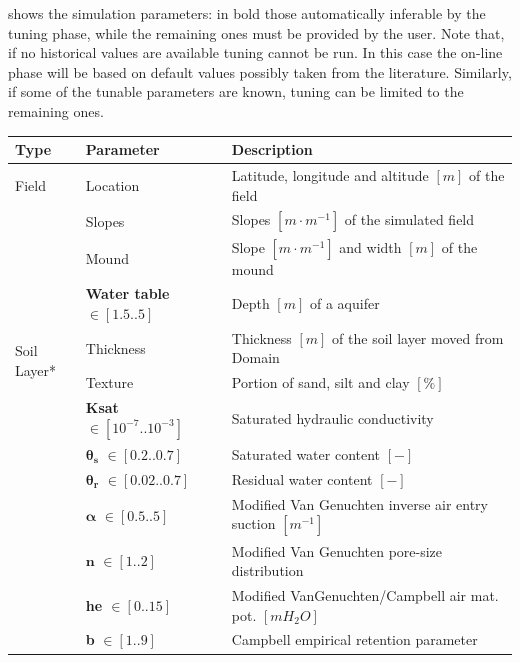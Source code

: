 shows the simulation parameters: in bold those automatically inferable by the tuning phase, while the remaining ones must be provided by the user. Note that, if no historical values are available tuning cannot be run. In this case the on-line phase will be based on default values possibly taken from the literature. Similarly, if some of the tunable parameters are known, tuning can be limited to the remaining ones.

\begin{table}[H]
	\centering
	\scriptsize
	\begin{tabular}{p{1.2cm}p{5cm}p{7.5cm}}
 		\textbf{Type} & \textbf{Parameter} & \textbf{Description} \\
		\hline%
		Field & Location &  Latitude, longitude and altitude $[m]$ of the field\\
		& Slopes & Slopes $[m \cdot m^{-1}]$ of the simulated field \\
		& Mound & Slope $[m \cdot m^{-1}]$ and width $[m]$ of the mound \\
		& \textbf{Water table} $\in [1.5..5]$ & Depth $[m]$ of a aquifer\\ 
		\hline%
		\multirow{2}{1cm}{Soil Layer*} & Thickness & Thickness $[m]$ of the soil layer moved from Domain\\
		& Texture & Portion of sand, silt and clay $[\%]$ \\ %
		& \textbf{Ksat $\in [10^{-7}..10^{-3}]$ } & Saturated hydraulic conductivity  \\ %
		& $\pmb{\theta_s}$ $\in [0.2..0.7]$ & Saturated water content $[-]$\\  
		& $\pmb{\theta_r}$ $\in [0.02..0.7]$ & Residual water content $[-]$ \\  
		& $\pmb{\alpha}$ $\in [0.5..5]$ & Modified Van Genuchten inverse air entry suction $[m^{-1}]$\\  
		& $\mathbf{n}$ $\in [1..2]$ & Modified Van Genuchten pore-size distribution\\
		& \textbf{he $\in [0..15]$} & Modified VanGenuchten/Campbell air mat. pot. $[m H_2O]$ \\ 
		& \textbf{b} $\in [1..9]$ & Campbell empirical retention parameter\\ 

\end{tabular}
\end{table}

